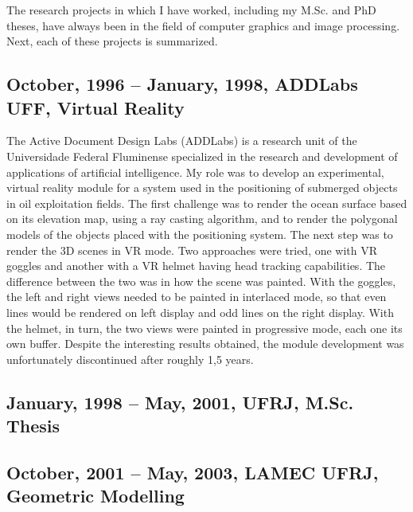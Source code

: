\documentclass[a4paper]{article}
\begin{document}
The research projects in which I have worked, including my M.Sc. and PhD theses, have always been in the field of computer graphics and image processing. Next, each of these projects is summarized.

\subsection{October, 1996 -- January, 1998, ADDLabs UFF, Virtual Reality}

The Active Document Design Labs (ADDLabs) is a research unit of the Universidade Federal Fluminense specialized in the research and development of applications of artificial intelligence. My role was to develop an experimental, virtual reality module for a system used in the positioning of submerged objects in oil exploitation fields. The first challenge was to render the ocean surface based on its elevation map, using a ray casting algorithm, and to render the polygonal models of the objects placed with the positioning system. The next step was to render the 3D scenes in VR mode. Two approaches were tried, one with VR goggles and another with a VR helmet having head tracking capabilities. The difference between the two was in how the scene was painted. With the goggles, the left and right views needed to be painted in interlaced mode, so that even lines would be rendered on left display and odd lines on the right display. With the helmet, in turn, the two views were painted in progressive mode, each one its own buffer. Despite the interesting results obtained, the module development was unfortunately discontinued after roughly 1,5 years.

\subsection{January, 1998 -- May, 2001, UFRJ, M.Sc. Thesis}

\subsection{October, 2001 -- May, 2003, LAMEC UFRJ, Geometric Modelling}
\end{document}
